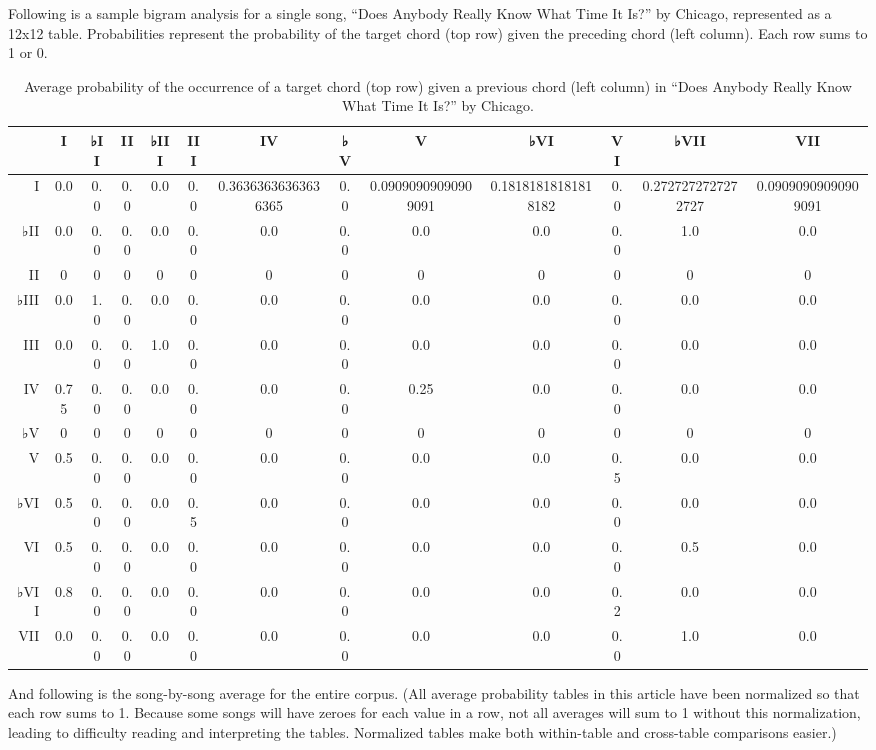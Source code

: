 Following is a sample bigram analysis for a single song, ``Does Anybody Really Know What Time It Is?'' by Chicago, represented as a 12x12 table. Probabilities represent the probability of the target chord (top row) given the preceding chord (left column). Each row sums to 1 or 0.

\begin{table}[htbp]
\begin{minipage}{\linewidth}
\setlength{\tymax}{0.5\linewidth}
\centering
\small
\caption{Average probability of the occurrence of a target chord (top row) given a previous chord (left column) in ``Does Anybody Really Know What Time It Is?'' by Chicago.}
\label{averageprobabilityoftheoccurrenceofatargetchordtoprowgivenapreviouschordleftcolumnindoesanybodyreallyknowwhattimeitisbychicago.}
\begin{tabulary}{\textwidth}{@{}RCCCCCCCCCCCC@{}} \toprule
&I&♭II&II&♭III&III&IV&♭V&V&♭VI&VI&♭VII&VII\\
\midrule
I&0.0&0.0&0.0&0.0&0.0&0.36363636363636365&0.0&0.09090909090909091&0.18181818181818182&0.0&0.2727272727272727&0.09090909090909091\\
♭II&0.0&0.0&0.0&0.0&0.0&0.0&0.0&0.0&0.0&0.0&1.0&0.0\\
II&0&0&0&0&0&0&0&0&0&0&0&0\\
♭III&0.0&1.0&0.0&0.0&0.0&0.0&0.0&0.0&0.0&0.0&0.0&0.0\\
III&0.0&0.0&0.0&1.0&0.0&0.0&0.0&0.0&0.0&0.0&0.0&0.0\\
IV&0.75&0.0&0.0&0.0&0.0&0.0&0.0&0.25&0.0&0.0&0.0&0.0\\
♭V&0&0&0&0&0&0&0&0&0&0&0&0\\
V&0.5&0.0&0.0&0.0&0.0&0.0&0.0&0.0&0.0&0.5&0.0&0.0\\
♭VI&0.5&0.0&0.0&0.0&0.5&0.0&0.0&0.0&0.0&0.0&0.0&0.0\\
VI&0.5&0.0&0.0&0.0&0.0&0.0&0.0&0.0&0.0&0.0&0.5&0.0\\
♭VII&0.8&0.0&0.0&0.0&0.0&0.0&0.0&0.0&0.0&0.2&0.0&0.0\\
VII&0.0&0.0&0.0&0.0&0.0&0.0&0.0&0.0&0.0&0.0&1.0&0.0\\

\bottomrule

\end{tabulary}
\end{minipage}
\end{table}

And following is the song-by-song average for the entire corpus. (All average probability tables in this article have been normalized so that each row sums to 1. Because some songs will have zeroes for each value in a row, not all averages will sum to 1 without this normalization, leading to difficulty reading and interpreting the tables. Normalized tables make both within-table and cross-table comparisons easier.)

